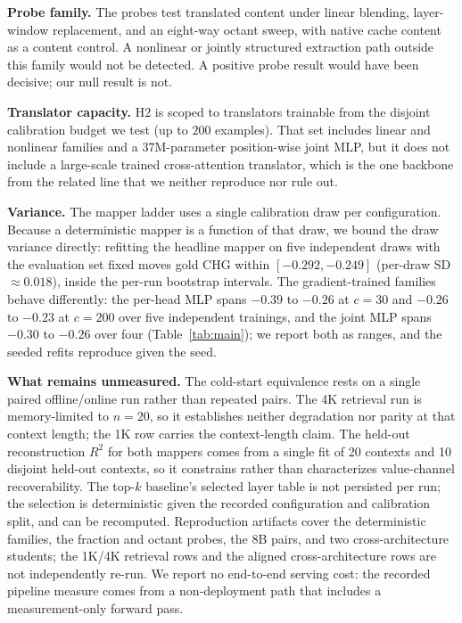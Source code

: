\documentclass{article} %
\begin{document}
\textbf{Probe family.} The probes test translated content under linear
blending, layer-window replacement, and an eight-way octant sweep, with native
cache content as a content control. A nonlinear or jointly structured
extraction path outside this family would not be detected. A positive probe
result would have been decisive; our null result is not.

\textbf{Translator capacity.} H2 is scoped to translators trainable from the
disjoint calibration budget we test (up to $200$ examples). That set includes
linear and nonlinear families and a $37$M-parameter position-wise joint MLP,
but it does not
include a large-scale trained cross-attention translator, which is the one
backbone from the related line that we neither reproduce nor rule out.

\textbf{Variance.} The mapper ladder uses a single calibration draw per
configuration. Because a deterministic mapper is a function of that draw, we
bound the draw variance directly: refitting the headline mapper on five
independent draws with the evaluation set fixed moves gold CHG within
$[-0.292, -0.249]$ (per-draw SD $\approx 0.018$), inside the per-run bootstrap
intervals. The gradient-trained families behave differently: the per-head MLP
spans $-0.39$ to $-0.26$ at $c{=}30$ and $-0.26$ to $-0.23$ at $c{=}200$ over
five independent trainings, and the joint MLP spans $-0.30$ to $-0.26$ over
four (Table~\ref{tab:main}); we report both as ranges, and the seeded refits
reproduce given the seed.

\textbf{What remains unmeasured.} The cold-start equivalence rests on a single
paired offline/online run rather than repeated pairs. The 4K retrieval run is
memory-limited to
$n{=}20$, so it establishes neither degradation nor parity at that context
length; the 1K row carries the context-length claim. The held-out reconstruction
$R^2$ for both mappers comes from a single fit of 20 contexts and 10 disjoint
held-out contexts, so it constrains rather than characterizes value-channel
recoverability. The top-$k$ baseline's selected layer table is not persisted per
run; the selection is deterministic given the recorded configuration and
calibration split, and can be recomputed. Reproduction artifacts cover the
deterministic families, the fraction and octant probes, the 8B pairs, and two
cross-architecture students; the 1K/4K retrieval rows and the aligned
cross-architecture rows are not independently re-run. We report no end-to-end
serving cost: the recorded pipeline measure comes from a non-deployment path
that includes a measurement-only forward pass.
\end{document}
